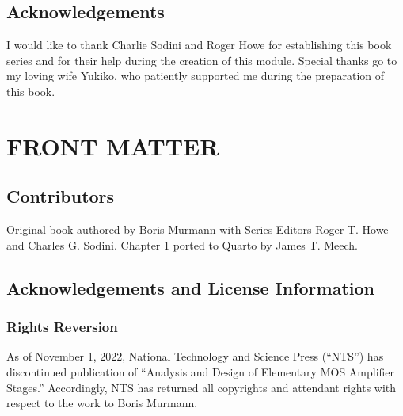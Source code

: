 \documentclass[
  11pt,
  letterpaper,
  abstract]{scrbook}
\renewcommand*\contentsname{Table of contents}
\newcommand\contentsname{Table of contents}
\begin{document}
\renewcommand*\contentsname{Table of contents}
{
\setcounter{tocdepth}{2}
\tableofcontents
}

\mainmatter
\chapter*{Acknowledgements}\label{acknowledgements}


I would like to thank Charlie Sodini and Roger Howe for establishing
this book series and for their help during the creation of this module.
Special thanks go to my loving wife Yukiko, who patiently supported me
during the preparation of this book.

\part{FRONT MATTER}

\chapter*{Contributors}\label{contributors}


Original book authored by Boris Murmann with Series Editors Roger T.
Howe and Charles G. Sodini. Chapter 1 ported to Quarto by James T.
Meech.

\chapter*{Acknowledgements and License
Information}\label{acknowledgements-and-license-information}


\section*{Rights Reversion}\label{rights-reversion}


As of November 1, 2022, National Technology and Science Press (``NTS'')
has discontinued publication of ``Analysis and Design of Elementary MOS
Amplifier Stages.'' Accordingly, NTS has returned all copyrights and
attendant rights with respect to the work to Boris Murmann.
\end{document}
